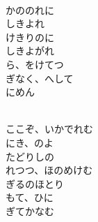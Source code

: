 \documentclass[10pt,b5j]{tarticle} %
\begin{document}
\begin{enumerate}
\begin{minipage}[c]{\blocksize}
        \vspace{\linespace}
        \item~\\
        かののれに\\
        しきよれ\\
        けきりのに\\
        しきよがれ\\
        ら、をけてつ\\
        ぎなく、へして\\
        にめん
        
    \end{minipage}
    \begin{minipage}[c]{\blocksize}
        
        \vspace{\linespace}
        \item~\\
        ここぞ、いかでれむ\\
        にき、のよ\\
        たどりしの\\
        れつつ、ほのめけむ\\ %
        ぎるのほとり\\
        もて、ひに\\
        ぎてかなむ
    
    \end{minipage}
\end{enumerate} %
\end{document}
